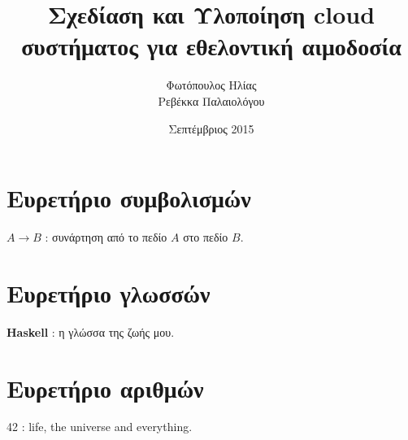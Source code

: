 \documentclass[diploma]{Styles/softlab-thesis}
\begin{document}

\frontmatter

\title{Σχεδίαση και Υλοποίηση cloud συστήματος για εθελοντική αιμοδοσία}
\author{Φωτόπουλος Ηλίας\\Ρεβέκκα Παλαιολόγου}
\date{Σεπτέμβριος 2015}




\maketitle






\tableofcontents
\listoftables
\listoffigures



\mainmatter


















\backmatter

\appendix

\chapter{Ευρετήριο συμβολισμών}

$A \rightarrow B$ : συνάρτηση από το πεδίο $A$ στο πεδίο $B$.

\chapter{Ευρετήριο γλωσσών}

\textbf{Haskell} : η γλώσσα της ζωής μου.

\chapter{Ευρετήριο αριθμών}

42 : life, the universe and everything.


\end{document}
